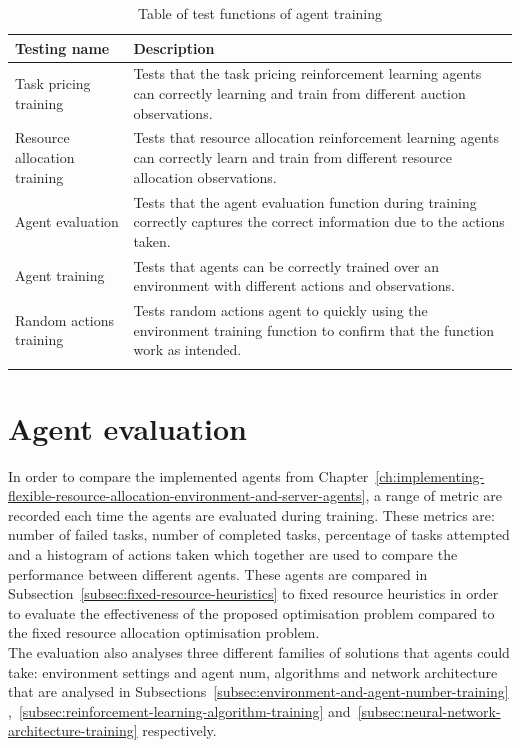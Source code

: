 \begin{longtable}{|p{3cm}|p{11cm}|} \hline
    \textbf{Testing name} & \textbf{Description} \\ \hline
    Task pricing training & Tests that the task pricing reinforcement learning agents can correctly learning and train
        from different auction observations. \\ \hline
    Resource allocation training & Tests that resource allocation reinforcement learning agents can correctly
        learn and train from different resource allocation observations. \\ \hline
    Agent evaluation & Tests that the agent evaluation function during training correctly captures the correct
        information due to the actions taken. \\ \hline
    Agent training & Tests that agents can be correctly trained over an environment with different actions and
        observations. \\ \hline
    Random actions training & Tests random actions agent to quickly using the environment training function to confirm
        that the function work as intended. \\ \hline
    \caption{Table of test functions of agent training}
    \label{tab:training_testing}
\end{longtable}

\section{Agent evaluation}
\label{sec:agent-evaluation}
In order to compare the implemented agents from
Chapter~\ref{ch:implementing-flexible-resource-allocation-environment-and-server-agents}, a range of metric are
recorded each time the agents are evaluated during training. These metrics are: number of failed tasks, number of
completed tasks, percentage of tasks attempted and a histogram of actions taken which together are used to compare the
performance between different agents. These agents are compared in Subsection~\ref{subsec:fixed-resource-heuristics} to
fixed resource heuristics in order to evaluate the effectiveness of the proposed optimisation problem compared to the
fixed resource allocation optimisation problem. \\
The evaluation also analyses three different families of solutions that agents could take: environment settings and
agent num, algorithms and network architecture that are analysed in Subsections~\ref{subsec:environment-and-agent-number-training}
,~\ref{subsec:reinforcement-learning-algorithm-training} and~\ref{subsec:neural-network-architecture-training}
respectively.

